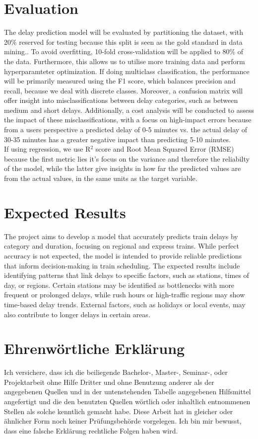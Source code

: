 \documentclass[a4paper,oneside,bibliography=totoc]{scrbook}
\begin{document}
\chapter{Evaluation}\label{ch:eval}
The delay prediction model will be evaluated by partitioning the dataset, with 20\% reserved for testing because this split is seen as the gold standard in data mining..
To avoid overfitting, 10-fold cross-validation will be applied to 80\% of the data. Furthermore, this allows us to utilise more training data and perform hyperparamteter optimization.
If doing multiclass classification, the performance will be primarily measured using the F1 score, which balances precision and recall, because we deal with discrete classes.
Moreover, a confusion matrix will offer insight into misclassifications between delay categories,
such as between medium and short delays.
Additionally, a cost analysis will be conducted to assess the impact of these misclassifications,
with a focus on high-impact errors because from a users perspective a predicted delay of 0-5 minutes vs. the actual delay of 30-35 minutes has a greater negative impact than predicting 5-10 minutes.
\\ If using regression, we use R$^2$ score and Root Mean Squared Error (RMSE) because the first metric lies it's focus on the variance and therefore the reliabilty of the model, while the latter give insights in how
far the predicted values are from the actual values, in the same units as the target variable.



\chapter{Expected Results}\label{sec:expected_results}
The project aims to develop a model that accurately predicts train delays by category and duration, focusing on regional and express trains.
While perfect accuracy is not expected, the model is intended to provide reliable predictions that inform decision-making in train scheduling.
The expected results include identifying patterns that link delays to specific factors, such as stations, times of day, or regions.
Certain stations may be identified as bottlenecks with more frequent or prolonged delays, while rush hours or high-traffic regions may show time-based delay trends.
External factors, such as holidays or local events, may also contribute to longer delays in certain areas.


\backmatter

\chapter{Ehrenwörtliche Erklärung}
Ich versichere, dass ich die beiliegende Bachelor-, Master-, Seminar-, oder
Projektarbeit ohne Hilfe Dritter und ohne Benutzung anderer als der angegebenen
Quellen und in der untenstehenden Tabelle angegebenen Hilfsmittel angefertigt
und die den benutzten Quellen wörtlich oder inhaltlich entnommenen Stellen als
solche kenntlich gemacht habe. Diese Arbeit hat in gleicher oder ähnlicher Form
noch keiner Prüfungsbehörde vorgelegen. Ich bin mir bewusst, dass eine falsche
Erklärung rechtliche Folgen haben wird.
\end{document}
